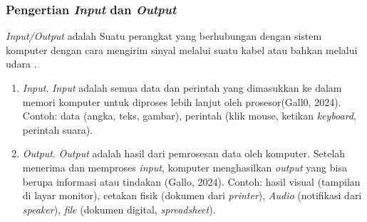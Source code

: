 \documentclass[12pt]{article}
\begin{document}
\subsubsection{Pengertian \textit{Input} dan \textit{Output}}
\textit{Input/Output} adalah Suatu perangkat yang berhubungan dengan sistem komputer dengan cara mengirim sinyal melalui suatu kabel atau bahkan melalui udara .\\
\begin{enumerate}
    \item \textit{Input}.
    \textit{Input} adalah semua data dan perintah yang dimasukkan ke dalam memori komputer untuk diproses lebih lanjut oleh prosesor(Gall0, 2024).
    Contoh: data (angka, teks, gambar), perintah (klik mouse, ketikan \textit{keyboard}, perintah suara).\\
    \item \textit{Output}.
    \textit{Output} adalah hasil dari pemrosesan data oleh komputer. Setelah menerima dan memproses \textit{input}, komputer menghasilkan \textit{output} yang bisa berupa informasi atau tindakan (Gallo, 2024).
    Contoh: hasil visual (tampilan di layar monitor), cetakan fisik (dokumen dari \textit{printer}), \textit{Audio} (notifikasi dari \textit{speaker}), \textit{file} (dokumen digital, \textit{spreadsheet}).\\
\end{enumerate}
\end{document}
